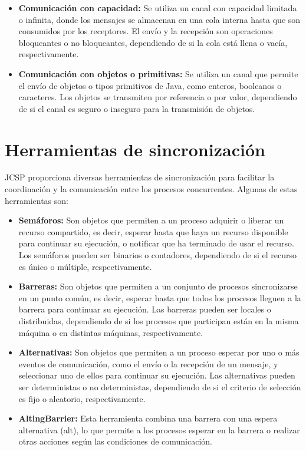 \begin{itemize}
	\item\textbf{Comunicación con capacidad:} Se utiliza un canal con capacidad limitada o infinita, donde los mensajes se almacenan en una cola interna hasta que son consumidos por los receptores. El envío y la recepción son operaciones bloqueantes o no bloqueantes, dependiendo de si la cola está llena o vacía, respectivamente.
	
	\item\textbf{Comunicación con objetos o primitivas:} Se utiliza un canal que permite el envío de objetos o tipos primitivos de Java, como enteros, booleanos o caracteres. Los objetos se transmiten por referencia o por valor, dependiendo de si el canal es seguro o inseguro para la transmisión de objetos.
\end{itemize}

\section*{Herramientas de sincronización}
JCSP proporciona diversas herramientas de sincronización para facilitar la coordinación y la comunicación entre los procesos concurrentes. Algunas de estas herramientas son:

\begin{itemize}
	\item\textbf{Semáforos:} Son objetos que permiten a un proceso adquirir o liberar un recurso compartido, es decir, esperar hasta que haya un recurso disponible para continuar su ejecución, o notificar que ha terminado de usar el recurso. Los semáforos pueden ser binarios o contadores, dependiendo de si el recurso es único o múltiple, respectivamente.
	
	\item\textbf{Barreras:} Son objetos que permiten a un conjunto de procesos sincronizarse en un punto común, es decir, esperar hasta que todos los procesos lleguen a la barrera para continuar su ejecución. Las barreras pueden ser locales o distribuidas, dependiendo de si los procesos que participan están en la misma máquina o en distintas máquinas, respectivamente.
	
	\item\textbf{Alternativas:} Son objetos que permiten a un proceso esperar por uno o más eventos de comunicación, como el envío o la recepción de un mensaje, y seleccionar uno de ellos para continuar su ejecución. Las alternativas pueden ser deterministas o no deterministas, dependiendo de si el criterio de selección es fijo o aleatorio, respectivamente.
	
	\item\textbf{AltingBarrier:} Esta herramienta combina una barrera con una espera alternativa (alt), lo que permite a los procesos esperar en la barrera o realizar otras acciones según las condiciones de comunicación.
\end{itemize}

